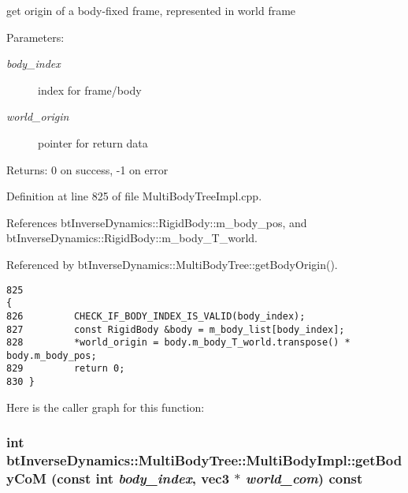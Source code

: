 get origin of a body-fixed frame, represented in world frame \begin{Desc}
\item[Parameters:]
\begin{description}
\item[{\em body\_\-index}]index for frame/body \item[{\em world\_\-origin}]pointer for return data \end{description}
\end{Desc}
\begin{Desc}
\item[Returns:]0 on success, -1 on error \end{Desc}
 

Definition at line 825 of file MultiBodyTreeImpl.cpp.

References btInverseDynamics::RigidBody::m\_\-body\_\-pos, and btInverseDynamics::RigidBody::m\_\-body\_\-T\_\-world.

Referenced by btInverseDynamics::MultiBodyTree::getBodyOrigin().

\begin{Code}\begin{verbatim}825                                                                                       {
826         CHECK_IF_BODY_INDEX_IS_VALID(body_index);
827         const RigidBody &body = m_body_list[body_index];
828         *world_origin = body.m_body_T_world.transpose() * body.m_body_pos;
829         return 0;
830 }
\end{verbatim}
\end{Code}




Here is the caller graph for this function:\hypertarget{classbt_inverse_dynamics_1_1_multi_body_tree_1_1_multi_body_impl_7787b44956c65fc638368273382070df}{
\subsubsection[getBodyCoM]{\setlength{\rightskip}{0pt plus 5cm}int btInverseDynamics::MultiBodyTree::MultiBodyImpl::getBodyCoM (const int {\em body\_\-index}, \/  {\bf vec3} $\ast$ {\em world\_\-com}) const}}
\label{classbt_inverse_dynamics_1_1_multi_body_tree_1_1_multi_body_impl_7787b44956c65fc638368273382070df}


